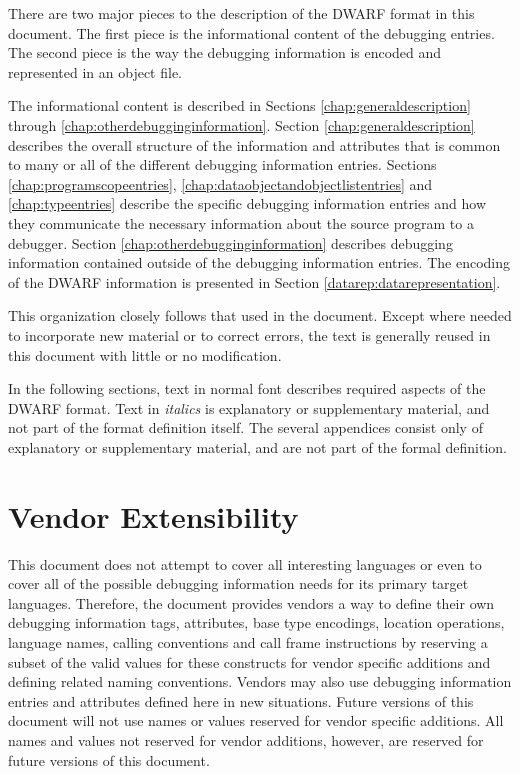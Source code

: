 There are two major pieces to the description of the DWARF
format in this document. The first piece is the informational
content of the debugging entries. The second piece is the
way the debugging information is encoded and represented in
an object file.

The informational content is described in 
Sections \ref{chap:generaldescription} 
through
\ref{chap:otherdebugginginformation}. 
Section  \ref{chap:generaldescription}
describes the overall structure of the information
and attributes that is common to many or all of the different
debugging information entries. 
Sections \ref{chap:programscopeentries}, 
\ref{chap:dataobjectandobjectlistentries} and 
\ref{chap:typeentries} describe
the specific debugging information entries and how they
communicate the necessary information about the source program
to a debugger. 
Section \ref{chap:otherdebugginginformation} 
describes debugging information
contained outside of the debugging information entries. The
encoding of the DWARF information is presented in 
Section \ref{datarep:datarepresentation}.

This organization closely follows that used in the 
\DWARFVersionIV{} document. Except where needed to incorporate
new material or to correct errors, the \DWARFVersionIV{}
text is generally reused in this document with little or
no modification.

In the following sections, text in normal font describes
required aspects of the DWARF format.  Text in \textit{italics} is
explanatory or supplementary material, and not part of the
format definition itself. The several appendices consist only
of explanatory or supplementary material, and are not part
of the formal definition.

\section{Vendor Extensibility}

This document does not attempt to cover all interesting
languages or even to cover all of the possible debugging
information needs for its primary target languages. 
Therefore,
the document provides vendors a way to define their own
debugging information tags, attributes, base type encodings,
location operations, language names, calling conventions and
call frame instructions by reserving a subset of the valid
values for these constructs for vendor specific additions
and defining related naming conventions. 
Vendors may also use
debugging information entries and attributes defined here in
new situations. 
Future versions of this document will not use
names or values reserved for vendor specific additions. 
All
names and values not reserved for vendor additions, however,
are reserved for future versions of this document.

